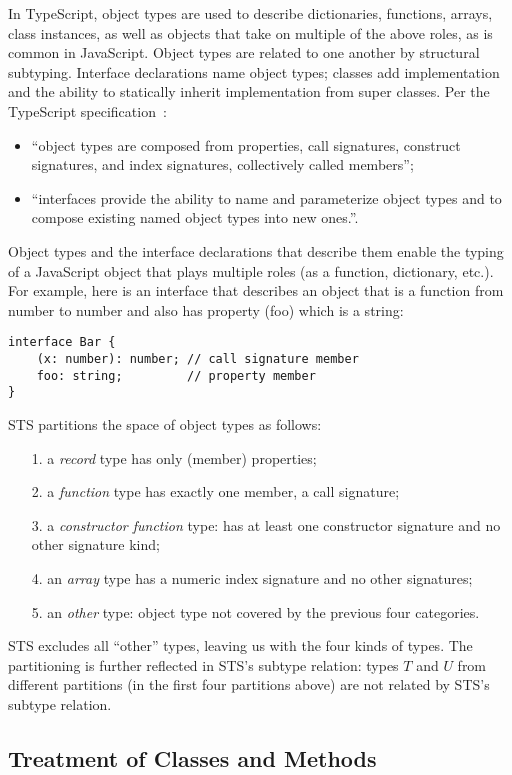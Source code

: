 In TypeScript, object types are used to describe dictionaries, functions, arrays, class instances,
as well as objects that take on multiple of the above roles, as is common in JavaScript. Object types are
related to one another by structural subtyping.  Interface declarations name object types; classes add implementation
and the ability to statically inherit implementation from super classes. Per the TypeScript specification~\cite{TSspec2016}:
\begin{itemize}
\item ``object types are composed from properties, call signatures, construct signatures, and index signatures, collectively called members'';
\item ``interfaces provide the ability to name and parameterize object types and to compose existing named object types into new ones.''.
\end{itemize} 
Object types and the interface declarations that describe them enable the typing of a JavaScript object that plays multiple roles
(as a function, dictionary, etc.). For example, here is an interface that describes an object that is a function from number to number
and also has property (foo) which is a string:
\begin{lstlisting}
interface Bar {
    (x: number): number; // call signature member
    foo: string;         // property member
}
\end{lstlisting}
STS partitions the space of object types as follows:
\begin{itemize}
\item[1.] a \emph{record} type has only (member) properties;
\item[2.] a \emph{function} type has exactly one member, a call signature;
\item[3.] a \emph{constructor function} type: has at least one constructor signature and no other signature kind;
\item[4.] an \emph{array} type has a numeric index signature and no other signatures;
\item[5.] an \emph{other} type: object type not covered by the previous four categories.
\end{itemize}
STS excludes all ``other'' types, leaving us with the four kinds of types.
The partitioning is further reflected in STS's subtype relation: 
types $T$ and $U$ from different partitions (in the first four partitions above)
are not related by STS's subtype relation.

\subsection{Treatment of Classes and Methods}

